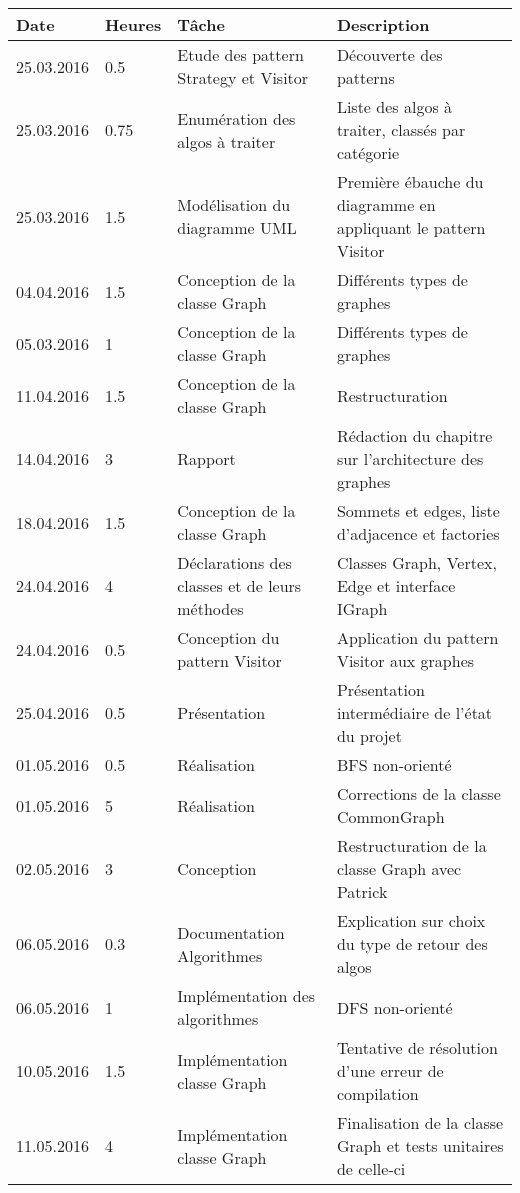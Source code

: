 \documentclass[french]{article}
\begin{document}
	\begin{tabular}{p{}|p{}|p{}|p{}}
		Date&Heures&Tâche&Description\\
		\hline \hline
		25.03.2016&0.5&Etude des pattern Strategy et Visitor&Découverte des patterns\\
		\hline
		25.03.2016&0.75&Enumération des algos à traiter&Liste des algos à traiter, classés par catégorie\\
		\hline
		25.03.2016&1.5&Modélisation du diagramme UML&Première ébauche du diagramme en appliquant le pattern Visitor\\
		\hline
		04.04.2016&1.5&Conception de la classe Graph&Différents types de graphes\\
		\hline
		05.03.2016&1&Conception de la classe Graph&Différents types de graphes\\
		\hline
		11.04.2016&1.5&Conception de la classe Graph&Restructuration\\
		\hline
		14.04.2016&3&Rapport&Rédaction du chapitre sur l'architecture des graphes\\
		\hline
		18.04.2016&1.5&Conception de la classe Graph&Sommets et edges, liste d'adjacence et factories\\
		\hline
		24.04.2016&4&Déclarations des classes et de leurs méthodes&Classes Graph, Vertex, Edge et interface IGraph\\
		\hline
		24.04.2016&0.5&Conception du pattern Visitor&Application du pattern Visitor aux graphes\\
		\hline
		25.04.2016 & 0.5 & Présentation & Présentation intermédiaire de l'état du projet\\
		\hline
		01.05.2016 & 0.5 & Réalisation & BFS non-orienté\\
		\hline
		01.05.2016 & 5 & Réalisation & Corrections de la classe CommonGraph\\
		\hline
		02.05.2016 & 3 & Conception & Restructuration de la classe Graph avec Patrick\\
		\hline
		06.05.2016 & 0.3 & Documentation Algorithmes & Explication sur choix du type de retour des algos\\
		\hline
		06.05.2016 & 1 & Implémentation des algorithmes & DFS non-orienté\\
		\hline
		10.05.2016 & 1.5 & Implémentation classe Graph & Tentative de résolution d'une erreur de compilation\\
		\hline
		11.05.2016 & 4 & Implémentation classe Graph & Finalisation de la classe Graph et tests unitaires de celle-ci \\

\end{tabular}
\end{document}
